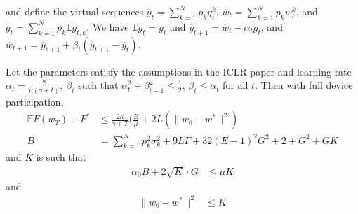 and define the virtual sequences $\overline{y}_{t}=\sum_{k=1}^{N}p_{k}y_{t}^{k}$,
$\overline{w}_{t}=\sum_{k=1}^{N}p_{k}w_{t}^{k}$, and $\overline{g}_{t}=\sum_{k=1}^{N}p_{k}\mathbb{E}g_{t,k}$.
We have $\mathbb{E}g_{t}=\overline{g}_{t}$ and $\overline{y}_{t+1}=\overline{w}_{t}-\alpha_{t}g_{t}$,
and $\overline{w}_{t+1}=\overline{y}_{t+1}+\beta_{t}(\overline{y}_{t+1}-\overline{y}_{t})$. 
\begin{theorem}
Let the parameters satisfy the assumptions in the ICLR paper and learning
rate $\alpha_{t}=\frac{2}{\mu(\gamma+t)}$, $\beta_{t}$ such that
$\alpha_{t}^{2}+\beta_{t-1}^{2}\leq\frac{1}{2}$, $\beta_{t}\leq\alpha_{t}$
for all $t$. Then with full device participation, 
\begin{align*}
\mathbb{E}F(w_{T})-F^{\ast} & \leq\frac{2\kappa}{\gamma+T}(\frac{B}{\mu}+2L(\|w_{0}-w^{\ast}\|^{2})\\
B & =\sum_{k=1}^{N}p_{k}^{2}\sigma_{k}^{2}+9L\Gamma+32(E-1)^{2}G^{2}+2+G^{2}+GK
\end{align*}
 and $K$ is such that 
\begin{align*}
\alpha_{0}B+2\sqrt{K}\cdot G & \leq\mu K
\end{align*}
 and
\begin{align*}
\|w_{0}-w^{\ast}\|^{2} & \leq K
\end{align*}
\end{theorem}
